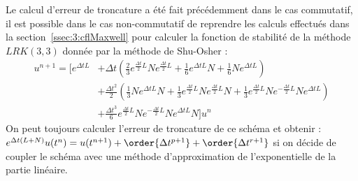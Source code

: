 Le calcul d'erreur de troncature a été fait précédemment dans le cas commutatif, il est possible dans le cas non-commutatif de reprendre les calculs effectués dans la section~\ref{ssec:3:cflMaxwell} pour calculer la fonction de stabilité de la méthode $LRK(3,3)$ donnée par la méthode de Shu-Osher :
$$
  \begin{aligned}
    u^{n+1} = \Big[ e^{\Delta tL} &+ \Delta t\left(\frac{2}{3}e^{\frac{\Delta t}{2}L}Ne^{\frac{\Delta t}{2}L}+\frac{1}{6}e^{\Delta tL}N + \frac{1}{6}Ne^{\Delta tL}\right) \\
    & + \frac{\Delta t^2}{2}\left(\frac{1}{3}Ne^{\Delta tL}N + \frac{1}{3}e^{\frac{\Delta t}{2}L}Ne^{\frac{\Delta t}{2}L}N + \frac{1}{3} e^{\frac{\Delta t}{2}L}Ne^{-\frac{\Delta t}{2}L}Ne^{\Delta tL} \right) \\
    & + \frac{\Delta t^3}{6}e^{\frac{\Delta t}{2}L}Ne^{-\frac{\Delta t}{2}L}Ne^{\Delta tL}N \Big]u^n
  \end{aligned}
$$
On peut toujours calculer l'erreur de troncature de ce schéma et obtenir : $e^{\Delta t(L+N)}u(t^n) = u(t^{n+1})+\order{\Delta t^{p+1}}+\order{\Delta t^{r+1}}$ si on décide de coupler le schéma avec une méthode d'approximation de l'exponentielle de la partie linéaire.
